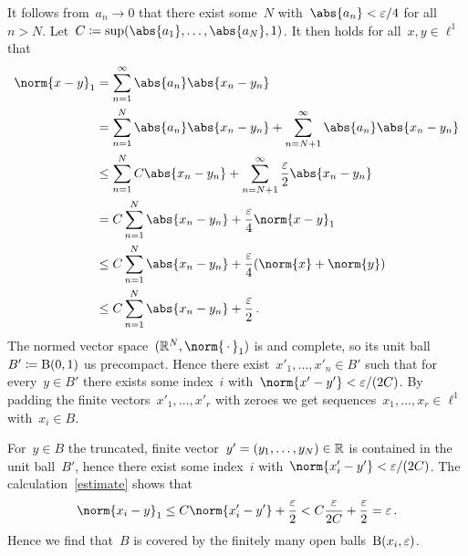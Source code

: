 It follows from~$a_n \to 0$ that there exist some~$N$ with~$\abs{a_n} < \varepsilon/4$ for all~$n > N$.
Let~$C \defined \sup(\abs{a_1}, \dotsc, \abs{a_N}, 1)$.
It then holds for all~$x, y \in \ell^1$ that
\begin{equation}
  \label{estimate}
  \begin{aligned}
          \norm{x-y}_1
    &=    \sum_{n=1}^\infty \abs{a_n} \abs{x_n-y_n} \\
    &=      \sum_{n=1}^N \abs{a_n} \abs{x_n - y_n}
          + \sum_{n=N+1}^\infty \abs{a_n} \abs{x_n - y_n} \\
    &\leq   \sum_{n=1}^N C \abs{x_n - y_n}
          + \sum_{n=N+1}^\infty \frac{\varepsilon}{2} \abs{x_n - y_n} \\
    &=      C \sum_{n=1}^N \abs{x_n - y_n}
          + \frac{\varepsilon}{4} \norm{x-y}_1  \\
    &\leq   C \sum_{n=1}^N \abs{x_n - y_n}
          + \frac{\varepsilon}{4} (\norm{x} + \norm{y}) \\
    &\leq   C \sum_{n=1}^N \abs{x_n - y_n}
          + \frac{\varepsilon}{2} \,.
  \end{aligned}
\end{equation}
The normed vector space~$(\Real^N, \norm{\,\cdot\,}_1)$ is  and complete, so its unit ball~$B' \defined \ball{1}{0}$ us precompact.
Hence there exist~$x'_1, \dotsc, x'_n \in B'$ such that for every~$y \in B'$ there exists some index~$i$ with~$\norm{x' - y'} < \varepsilon/(2C)$.
By padding the finite vectors~$x'_1, \dotsc, x'_r$ with zeroes we get sequences~$x_1, \dotsc, x_r \in \ell^1$ with~$x_i \in B$.

For~$y \in B$ the truncated, finite vector~$y' = (y_1, \dotsc, y_N) \in \Real$ is contained in the unit ball~$B'$, hence there exist some index~$i$ with~$\norm{x'_i - y'} < \varepsilon/(2C)$.
The calculation~\eqref{estimate} shows that
\[
        \norm{x_i - y}_1
  \leq  C \norm{x'_i - y'} + \frac{\varepsilon}{2}
  <     C \frac{\varepsilon}{2C} + \frac{\varepsilon}{2}
  =     \varepsilon \,.
\]
Hence we find that~$B$ is covered by the finitely many open balls~$\ball{\varepsilon}{x_i}$.




